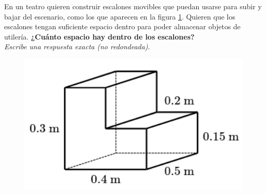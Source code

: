 En un teatro quieren construir escalones movibles que puedan
usarse para subir y bajar del escenario,
como los que aparecen en la figura \ref{fig:vol_area_01}.
Quieren que los escalones tengan suficiente espacio dentro para poder
almacenar objetos de utilería.
\textbf{¿Cuánto espacio hay dentro de los escalones?}\\
\textit{Escribe una respuesta exacta (no redondeada).}

\begin{minipage}{0.3\linewidth}
    \begin{figure}[H]
        \begin{center}
            \includegraphics[width=1\textwidth]{../images/vol_area_01}
        \end{center}
        \caption{}
        \label{fig:vol_area_01}
    \end{figure}
\end{minipage}
\begin{minipage}{0.7\linewidth}
    \begin{solutionbox}{6cm}
    \end{solutionbox}
\end{minipage}